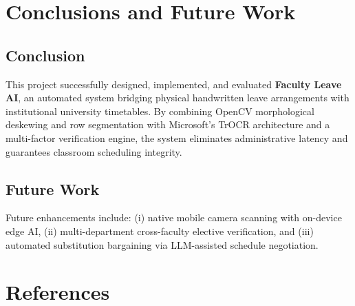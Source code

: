 \documentclass[12pt,letterpaper]{report}
\begin{document}
\chapter{Conclusions and Future Work}

\section{Conclusion}
This project successfully designed, implemented, and evaluated \textbf{Faculty Leave AI}, an automated system bridging physical handwritten leave arrangements with institutional university timetables. By combining OpenCV morphological deskewing and row segmentation with Microsoft’s TrOCR architecture and a multi-factor verification engine, the system eliminates administrative latency and guarantees classroom scheduling integrity.

\section{Future Work}
Future enhancements include: (i) native mobile camera scanning with on-device edge AI, (ii) multi-department cross-faculty elective verification, and (iii) automated substitution bargaining via LLM-assisted schedule negotiation.

\chapter*{References}
\end{document}
